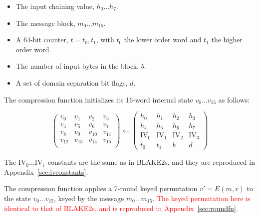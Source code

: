 \documentclass[11pt,notitlepage,a4paper]{article}
\newcommand{\IV}{\text{IV}}
\newcommand{\alert}[1]{\textcolor{red}{#1}}
\begin{document}
\begin{itemize}
    \item The input chaining value, $h_{0} \ldots h_{7}$.
    \item The message block, $m_{0} \ldots m_{15}$.
    \item A 64-bit counter, $t=t_{0},t_{1}$, with $t_{0}$ the lower order word
        and $t_{1}$ the higher order word.
    \item The number of input bytes in the block, $b$.
    \item A set of domain separation bit flags, $d$.
\end{itemize}

The compression function initializes its 16-word internal state $v_{0} \ldots
v_{15}$ as follows: 

\begin{equation*}
\begin{pmatrix}
v_{0} & v_{1} & v_{2} & v_{3} \\
v_{4} & v_{5} & v_{6} & v_{7} \\
v_{8} & v_{9} & v_{10} & v_{11} \\
v_{12} & v_{13} & v_{14} & v_{15} \\
\end{pmatrix}
\leftarrow
\begin{pmatrix}
h_{0} & h_{1} & h_{2} & h_{3} \\
h_{4} & h_{5} & h_{6} & h_{7} \\
\IV_{0} & \IV_{1} & \IV_{2} & \IV_{3} \\
t_{0} & t_{1} & b & d 
\end{pmatrix}
\end{equation*}

The $\IV_{0} \ldots \IV_{7}$ constants are the same as in
BLAKE2s, and they are reproduced in Appendix~\ref{sec:ivconstants}.

The compression function applies a 7-round keyed permutation $v' = E(m, v)$ to
the state $v_0 \dots v_{15}$, keyed by the message $m_0 \dots m_{15}$. \alert{The
keyed permutation here is identical to that of BLAKE2s, and is
reproduced in Appendix~\ref{sec:roundfn}.}
\end{document}
